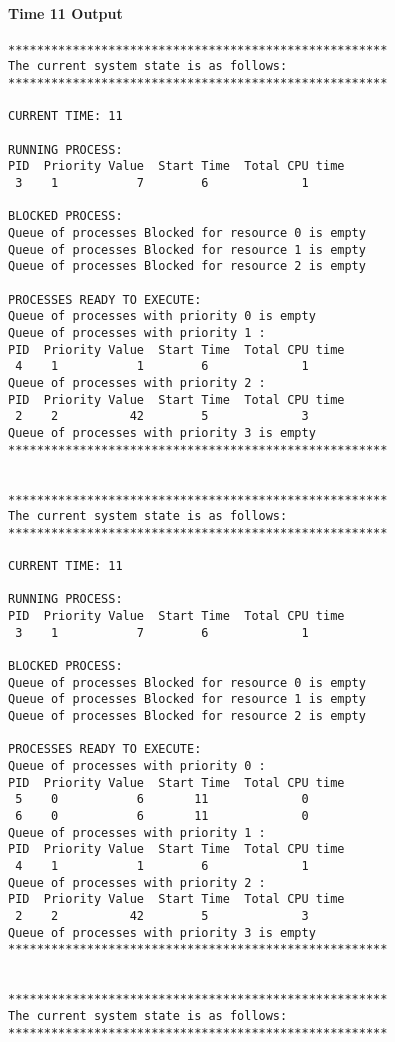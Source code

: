 \paragraph*{Time 11 Output}
\indent \fontsize{10}{9.7}\selectfont \begin{verbatim}
*****************************************************
The current system state is as follows:
*****************************************************

CURRENT TIME: 11

RUNNING PROCESS:
PID  Priority Value  Start Time  Total CPU time
 3    1           7        6             1

BLOCKED PROCESS:
Queue of processes Blocked for resource 0 is empty
Queue of processes Blocked for resource 1 is empty
Queue of processes Blocked for resource 2 is empty

PROCESSES READY TO EXECUTE:
Queue of processes with priority 0 is empty
Queue of processes with priority 1 :
PID  Priority Value  Start Time  Total CPU time
 4    1           1        6             1
Queue of processes with priority 2 :
PID  Priority Value  Start Time  Total CPU time
 2    2          42        5             3
Queue of processes with priority 3 is empty
*****************************************************


*****************************************************
The current system state is as follows:
*****************************************************

CURRENT TIME: 11

RUNNING PROCESS:
PID  Priority Value  Start Time  Total CPU time
 3    1           7        6             1

BLOCKED PROCESS:
Queue of processes Blocked for resource 0 is empty
Queue of processes Blocked for resource 1 is empty
Queue of processes Blocked for resource 2 is empty

PROCESSES READY TO EXECUTE:
Queue of processes with priority 0 :
PID  Priority Value  Start Time  Total CPU time
 5    0           6       11             0
 6    0           6       11             0
Queue of processes with priority 1 :
PID  Priority Value  Start Time  Total CPU time
 4    1           1        6             1
Queue of processes with priority 2 :
PID  Priority Value  Start Time  Total CPU time
 2    2          42        5             3
Queue of processes with priority 3 is empty
*****************************************************


*****************************************************
The current system state is as follows:
*****************************************************


\end{verbatim}
